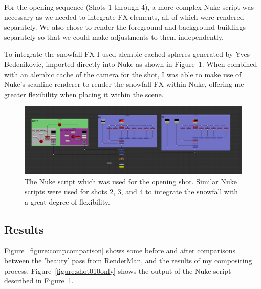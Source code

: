 \documentclass[11pt]{article}
\begin{document}
For the opening sequence (Shots 1 through 4), a more complex Nuke script was necessary as we needed to integrate FX elements, all of which were rendered separately. We also chose to render the foreground and background buildings separately so that we could make adjustments to them independently.

To integrate the snowfall FX I used alembic cached spheres generated by Yves Bedenikovic, imported directly into Nuke as shown in Figure~\ref{figure:shot010comp}. When combined with an alembic cache of the camera for the shot, I was able to make use of Nuke's scanline renderer to render the snowfall FX within Nuke, offering me greater flexibility when placing it within the scene.

\begin{figure}[htbp]\centering
	\includegraphics[width=1.0\linewidth]{images/shot010comp.png}
	\caption{\label{figure:shot010comp} The Nuke script which was used for the opening shot. Similar Nuke scripts were used for shots 2, 3, and 4 to integrate the snowfall with a great degree of flexibility.} %
\end{figure}

\subsection{Results}

Figure~\ref{figure:compcomparison} shows some before and after comparisons between the 'beauty' pass from RenderMan, and the results of my compositing process. Figure~\ref{figure:shot010only} shows the output of the Nuke script described in Figure~\ref{figure:shot010comp}.
\end{document}
